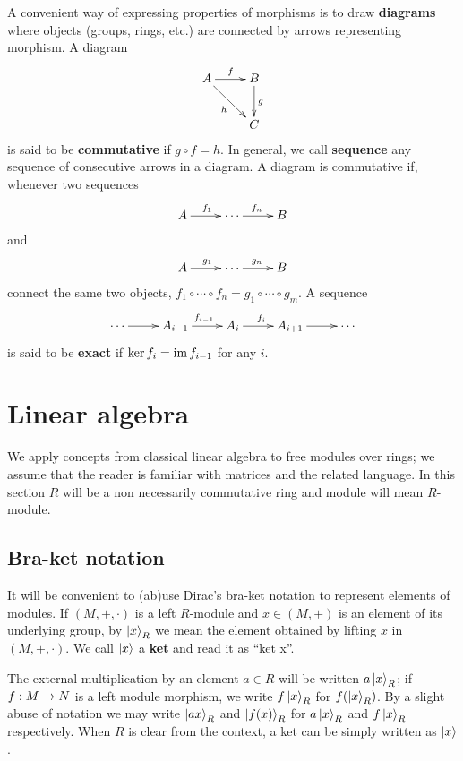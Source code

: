 A convenient way of expressing properties of morphisms is to draw
\textbf{diagrams} where objects (groups, rings, etc.)
are connected by arrows representing morphism. A diagram
\[\xymatrix{A\ar[r]^f\ar[dr]_h & B \ar[d]^g\\&C}\]
is said to be \textbf{commutative} if
$g\circ f = h$. In general, we call \textbf{sequence}
any sequence of consecutive arrows in a diagram. A diagram is
commutative if, whenever two sequences
\[\xymatrix{A\ar[r]^{f_1} & \cdots \ar[r]^{f_n} & B}\]
and
\[\xymatrix{A\ar[r]^{g_1} & \cdots \ar[r]^{g_n} & B}\]
connect the same two objects, $f_1\circ\cdots\circ
f_n=g_1\circ\cdots\circ g_m$.  A sequence
\[\xymatrix{\cdots \ar[r] & A_{i-1}\ar[r]^{f_{i-1}} & A_i \ar[r]^{f_i}
  & A_{i+1} \ar[r] & \cdots}\]
is said to be 
\textbf{exact} if $\ker f_i = \operatorname{im} f_{i-1}$ for
any $i$.


\section{Linear algebra}
\label{sec:linear-algebra}

We apply concepts from classical linear algebra to free modules over
rings; we assume that the reader is familiar with matrices and the
related language. In this section $R$ will be a non necessarily
commutative ring and module will mean $R$-module.

\subsection{Bra-ket notation}
\label{sec:linear-algebra:bra-ket}

It will be convenient to (ab)use Dirac's
bra-ket notation to represent elements of
modules. If $(M,+,\cdot)$ is a left $R$-module and $x\in (M,+)$ is an
element of its underlying group, by $\left\lvert x \right\rangle_R$ we mean the element
obtained by lifting $x$ in $(M,+,\cdot)$. We call $\left\lvert x \right\rangle$ a
\textbf{ket} and read it as ``ket x''.

The external multiplication by an element $a\in R$ will be written
$a\left\lvert x \right\rangle_R$; if $f:M\rightarrow N$ is a left module morphism, we write
$f\left\lvert x \right\rangle_R$ for $f(\left\lvert x \right\rangle_R)$. By a slight abuse of notation we may
write $\left\lvert a x \right\rangle_R$ and $\left\lvert f(x) \right\rangle_R$ for $a\left\lvert x \right\rangle_R$ and
$f\left\lvert x \right\rangle_R$ respectively. When $R$ is clear from the context, a ket
can be simply written as $\left\lvert x \right\rangle$.

